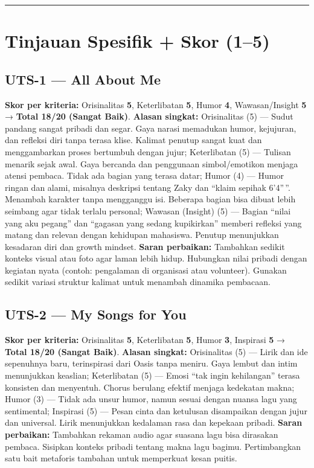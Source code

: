 \documentclass[
  letterpaper,
  DIV=11,
  numbers=noendperiod]{scrreprt}
\begin{document}
\begin{center}\rule{0.5\linewidth}{0.5pt}\end{center}

\section{Tinjauan Spesifik + Skor
(1--5)}\label{tinjauan-spesifik-skor-15}

\subsection{UTS-1 --- All About Me}\label{uts-1-all-about-me-1}

\textbf{Skor per kriteria:} Orisinalitas \textbf{5}, Keterlibatan
\textbf{5}, Humor \textbf{4}, Wawasan/Insight \textbf{5} → \textbf{Total
18/20 (Sangat Baik)}. \textbf{Alasan singkat:} Orisinalitas (5) ---
Sudut pandang sangat pribadi dan segar. Gaya narasi memadukan humor,
kejujuran, dan refleksi diri tanpa terasa klise. Kalimat penutup sangat
kuat dan menggambarkan proses bertumbuh dengan jujur; Keterlibatan (5)
--- Tulisan menarik sejak awal. Gaya bercanda dan penggunaan
simbol/emotikon menjaga atensi pembaca. Tidak ada bagian yang terasa
datar; Humor (4) --- Humor ringan dan alami, misalnya deskripsi tentang
Zaky dan ``klaim sepihak 6'4''\,''. Menambah karakter tanpa mengganggu
isi. Beberapa bagian bisa dibuat lebih seimbang agar tidak terlalu
personal; Wawasan (Insight) (5) --- Bagian ``nilai yang aku pegang'' dan
``gagasan yang sedang kupikirkan'' memberi refleksi yang matang dan
relevan dengan kehidupan mahasiswa. Penutup menunjukkan kesadaran diri
dan growth mindset. \textbf{Saran perbaikan:} Tambahkan sedikit konteks
visual atau foto agar laman lebih hidup. Hubungkan nilai pribadi dengan
kegiatan nyata (contoh: pengalaman di organisasi atau volunteer).
Gunakan sedikit variasi struktur kalimat untuk menambah dinamika
pembacaan.

\subsection{UTS-2 --- My Songs for You}\label{uts-2-my-songs-for-you-1}

\textbf{Skor per kriteria:} Orisinalitas \textbf{5}, Keterlibatan
\textbf{5}, Humor \textbf{3}, Inspirasi \textbf{5} → \textbf{Total 18/20
(Sangat Baik)}. \textbf{Alasan singkat:} Orisinalitas (5) --- Lirik dan
ide sepenuhnya baru, terinspirasi dari Oasis tanpa meniru. Gaya lembut
dan intim menunjukkan keaslian; Keterlibatan (5) --- Emosi ``tak ingin
kehilangan'' terasa konsisten dan menyentuh. Chorus berulang efektif
menjaga kedekatan makna; Humor (3) --- Tidak ada unsur humor, namun
sesuai dengan nuansa lagu yang sentimental; Inspirasi (5) --- Pesan
cinta dan ketulusan disampaikan dengan jujur dan universal. Lirik
menunjukkan kedalaman rasa dan kepekaan pribadi. \textbf{Saran
perbaikan:} Tambahkan rekaman audio agar suasana lagu bisa dirasakan
pembaca. Sisipkan konteks pribadi tentang makna lagu bagimu.
Pertimbangkan satu bait metaforis tambahan untuk memperkuat kesan
puitis.
\end{document}
